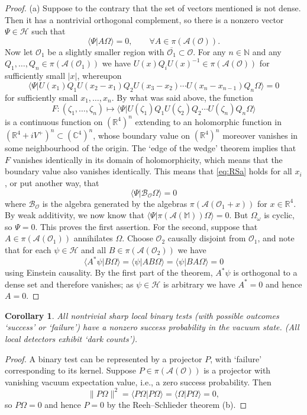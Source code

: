 \documentclass[12pt,a4paper]{article}
\newcommand{\1}{\mathds{1}}                         %
\newcommand{\NN}{\mathbb{N}}          %
\newcommand{\RR}{\mathbb{R}}           %
\newcommand{\CC}{\mathbb{C}}           %
\newcommand{\Ocal}{\mathcal{O}}
\newcommand{\MM}{\mathbb{M}}
\newcommand{\HH}{{\mathcal{H}}}
\newcommand{\Ac}{{\mathcal{A}}}
\newcommand{\Bc}{{\mathcal{B}}}
\newcommand{\ip}[2]{\langle #1|#2\rangle}
\newtheorem{corollary}[theorem]{Corollary}
\begin{document}
\begin{proof} (a) Suppose to the contrary that the set of vectors mentioned is not dense. Then it has a nontrivial orthogonal complement, so there is a nonzero vector $\Psi\in\HH$ such that 
\[
\ip{\Psi}{A\Omega} = 0,\qquad \forall A\in\pi(\Ac(\Ocal)).
\]
Now let $\Ocal_1$ be a slightly smaller region with $\overline{\Ocal_1}\subset \Ocal$. For any $n\in\NN$ and any $Q_1,\ldots,Q_n\in\pi(\Ac(\Ocal_1))$ we have $U(x)Q_i U(x)^{-1}\in\pi(\Ac(\Ocal))$ for sufficiently small $|x|$, whereupon
\begin{equation}\label{eq:RSa}
\ip{\Psi}{U(x_1)Q_1 U(x_2-x_1) Q_2 U(x_3-x_2)\cdots U(x_n-x_{n-1})Q_n\Omega} = 0
\end{equation}
for sufficiently small $x_1,\ldots,x_n$. By what was said above, the function
\[
F: (\zeta_1,\ldots,\zeta_n)\mapsto \ip{\Psi}{U(\zeta_1)Q_1 U(\zeta_2) Q_2\cdots U(\zeta_n)Q_n\Omega} 
\]
is a continuous function on $(\RR^4)^n$ extending to an holomorphic function in $(\RR^4+iV^+)^n\subset (\CC^4)^n$, whose boundary value on $(\RR^4)^n$ moreover vanishes in some neighbourhood of the origin. The `edge of the wedge' theorem \cite{StreaterWightman,Vladimirov} implies that $F$ vanishes identically in its domain of holomorphicity, which means that the boundary value also vanishes identically. This means that \eqref{eq:RSa} holds for all $x_i$, or put another way, that
\[
\ip{\Psi}{\Bc_\Ocal\Omega}=0
\]
where $\Bc_\Ocal$ is the algebra generated by the algebras $\pi(\Ac(\Ocal_1+x))$ for $x\in\RR^4$. 
By weak additivity, we now know that $\ip{\Psi}{\pi(\Ac(\MM))\Omega} = 0$. But $\Omega_\omega$ is cyclic, so $\Psi=0$. This proves the first assertion. For the second, suppose that $A\in\pi(\Ac(\Ocal_1))$ annihilates $\Omega$. Choose $\Ocal_2$ causally disjoint from $\Ocal_1$, and note that for each $\psi\in\HH$ and all $B\in\pi(\Ac(\Ocal_2))$ we have
\[
\ip{A^*\psi}{B\Omega} = \ip{\psi}{AB\Omega} = \ip{\psi}{BA\Omega} = 0
\]
using Einstein causality. By the first part of the theorem, $A^*\psi$ is orthogonal to a dense set and therefore vanishes; as $\psi\in\HH$ is arbitrary we have $A^*=0$ and hence $A=0$. 
\end{proof}

\begin{corollary} 
	All nontrivial sharp local binary tests (with possible outcomes `success' or `failure') have a nonzero success probability in the vacuum state. (All local detectors exhibit `dark counts'). 
\end{corollary}
\begin{proof}
	A binary test can be represented by a projector $P$, with `failure' corresponding to its kernel. Suppose $P\in\pi(\Ac(\Ocal))$ is a projector with vanishing vacuum expectation value, i.e., a zero success probability. Then 
	\[
	\|P\Omega\|^2=  \ip{P\Omega}{P\Omega} = \ip{\Omega}{P\Omega} = 0,
	\]
	so
	$P\Omega=0$ and hence $P=0$ by the Reeh--Schlieder theorem (b). 
\end{proof}
\end{document}
